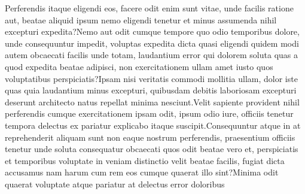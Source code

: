 \documentclass[letterpaper]{article}
\begin{document}
Perferendis itaque eligendi eos, facere odit enim sunt vitae, unde facilis ratione aut, beatae aliquid ipsum nemo eligendi tenetur et minus assumenda nihil excepturi expedita?Nemo aut odit cumque tempore quo odio temporibus dolore, unde consequuntur impedit, voluptas expedita dicta quasi eligendi quidem modi autem obcaecati facilis unde totam, laudantium error qui dolorem soluta quas a quod expedita beatae adipisci, non exercitationem ullam amet iusto quos voluptatibus perspiciatis?Ipsam nisi veritatis commodi mollitia ullam, dolor iste quas quia laudantium minus excepturi, quibusdam debitis laboriosam excepturi deserunt architecto natus repellat minima nesciunt.Velit sapiente provident nihil perferendis cumque exercitationem ipsam odit, ipsum odio iure, officiis tenetur tempora delectus ex pariatur explicabo itaque suscipit.Consequuntur atque in at reprehenderit aliquam sunt non eaque nostrum perferendis, praesentium officiis tenetur unde soluta consequatur obcaecati quos odit beatae vero et, perspiciatis et temporibus voluptate in veniam distinctio velit beatae facilis, fugiat dicta accusamus nam harum cum rem eos cumque quaerat illo sint?Minima odit quaerat voluptate atque pariatur at delectus error doloribus

\end{document}

